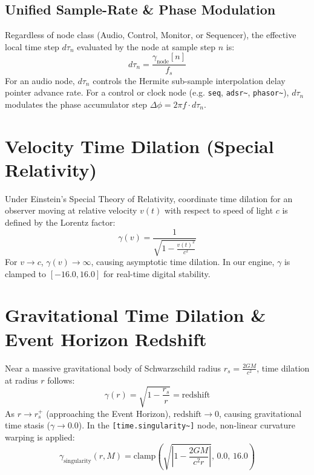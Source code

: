 \documentclass[11pt,a4paper]{article}
\begin{document}
\subsection{Unified Sample-Rate \& Phase Modulation}
Regardless of node class (Audio, Control, Monitor, or Sequencer), the effective local time step $d\tau_n$ evaluated by the node at sample step $n$ is:
\begin{equation}
d\tau_n = \frac{\gamma_{\text{node}}[n]}{f_s}
\end{equation}
For an audio node, $d\tau_n$ controls the Hermite sub-sample interpolation delay pointer advance rate. For a control or clock node (e.g. \texttt{seq}, \texttt{adsr\textasciitilde{}}, \texttt{phasor\textasciitilde{}}), $d\tau_n$ modulates the phase accumulator step $\Delta \phi = 2\pi f \cdot d\tau_n$.

\section{Velocity Time Dilation (Special Relativity)}
Under Einstein's Special Theory of Relativity, coordinate time dilation for an observer moving at relative velocity $v(t)$ with respect to speed of light $c$ is defined by the Lorentz factor:
\begin{equation}
\gamma(v) = \frac{1}{\sqrt{1 - \frac{v(t)^2}{c^2}}}
\end{equation}
For $v \to c$, $\gamma(v) \to \infty$, causing asymptotic time dilation. In our engine, $\gamma$ is clamped to $[-16.0, 16.0]$ for real-time digital stability.

\section{Gravitational Time Dilation \& Event Horizon Redshift}
Near a massive gravitational body of Schwarzschild radius $r_s = \frac{2GM}{c^2}$, time dilation at radius $r$ follows:
\begin{equation}
\gamma(r) = \sqrt{1 - \frac{r_s}{r}} = \text{redshift}
\end{equation}
As $r \to r_s^+$ (approaching the Event Horizon), $\text{redshift} \to 0$, causing gravitational time stasis ($\gamma \to 0.0$). In the \texttt{[time.singularity\textasciitilde{}]} node, non-linear curvature warping is applied:
\begin{equation}
\gamma_{\text{singularity}}(r, M) = \text{clamp}\left( \sqrt{\left| 1 - \frac{2GM}{c^2 r} \right|}, \, 0.0, \, 16.0 \right)
\end{equation}
\end{document}
